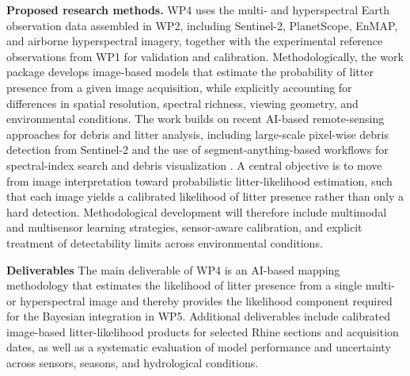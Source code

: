 \documentclass{scrartcl}
\begin{document}
\textbf{Proposed research methods.} WP4 uses the multi- and hyperspectral Earth observation data assembled in WP2, including Sentinel-2, PlanetScope, EnMAP, and airborne hyperspectral imagery, together with the experimental reference observations from WP1 for validation and calibration. Methodologically, the work package develops image-based models that estimate the probability of litter presence from a given image acquisition, while explicitly accounting for differences in spatial resolution, spectral richness, viewing geometry, and environmental conditions. The work builds on recent AI-based remote-sensing approaches for debris and litter analysis, including large-scale pixel-wise debris detection from Sentinel-2 \citep{russwurmcell2023} and the use of segment-anything-based workflows for spectral-index search and debris visualization . A central objective is to move from image interpretation toward probabilistic litter-likelihood estimation, such that each image yields a calibrated likelihood of litter presence rather than only a hard detection. Methodological development will therefore include multimodal and multisensor learning strategies, sensor-aware calibration, and explicit treatment of detectability limits across environmental conditions.     

\textbf{Deliverables} The main deliverable of WP4 is an AI-based mapping methodology that estimates the likelihood of litter presence from a single multi- or hyperspectral image and thereby provides the likelihood component required for the Bayesian integration in WP5. Additional deliverables include calibrated image-based litter-likelihood products for selected Rhine sections and acquisition dates, as well as a systematic evaluation of model performance and uncertainty across sensors, seasons, and hydrological conditions.   
\end{document}
